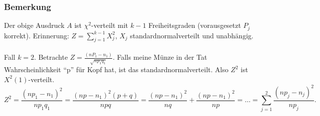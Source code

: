 \subsubsection{Bemerkung}
Der obige Ausdruck $A$ ist $\chi^2$-verteilt mit $k-1$ Freiheitsgraden (vorausgesetzt $P_j$ korrekt). Erinnerung: $Z=\sum_{j=1}^{k-1}X_j^2$, $X_j$ standardnormalverteilt und unabh\"angig.
\\~\\
Fall $k=2$. Betrachte $Z=\frac{(nP_1-n_1)}{\sqrt{np_1q_1}}$. Falls meine M\"unze in der Tat Wahrscheinlichkeit ``p'' f\"ur Kopf hat, ist das standardnormalverteilt. Also $Z^2$ ist $X^2(1)$-verteilt.
\[
Z^2=\frac{(np_1-n_1)^2}{np_1q_1}=\frac{(np-n_1)^2(p+q)}{npq}=\frac{(np-n_1)^2}{nq}+\frac{(np-n_1)^2}{np}=\ldots=\sum_{j=1}^2\frac{(np_j-n_j)^2}{np_j}.
\]
